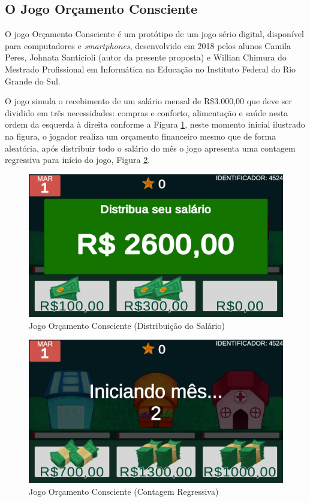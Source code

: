 \subsection{O Jogo Orçamento Consciente}
O jogo Orçamento Consciente é um protótipo de um jogo sério digital, disponível para computadores e \textit{smartphones}, desenvolvido em 2018 pelos alunos Camila Peres, Johnata Santicioli (autor da presente proposta) e Willian Chimura do Mestrado Profissional em Informática na Educação no Instituto Federal do Rio Grande do Sul.

O jogo simula o recebimento de um salário mensal de R{\$}3.000,00 que deve ser dividido em três necessidades: compras e conforto, alimentação e saúde nesta ordem da esquerda à direita conforme a Figura \ref{fig: figura01-salario}, neste momento inicial ilustrado na figura, o jogador realiza um orçamento financeiro mesmo que de forma aleatória, após distribuir todo o salário do mês o jogo apresenta uma contagem regressiva para início do jogo, Figura \ref{fig: figura02-contagem}.

\graphicspath{{figuras/}}
\begin{figure}[!ht]
\centering
\begin{minipage}{1.\linewidth}
\center
\caption{Jogo Orçamento Consciente (Distribuição do Salário)} \label{fig: figura01-salario}
\includegraphics[width=0.4\linewidth]{01-figura_distribuicao-salario.png}
\end{minipage}
\end{figure}

\graphicspath{{figuras/}}
\begin{figure}[!ht]
\centering
\begin{minipage}{1.\linewidth}
\center
\caption{Jogo Orçamento Consciente (Contagem Regressiva)} \label{fig: figura02-contagem}
\includegraphics[width=0.4\linewidth]{02-figura_contagem-regressiva-mes.png}
\end{minipage}
\end{figure}

